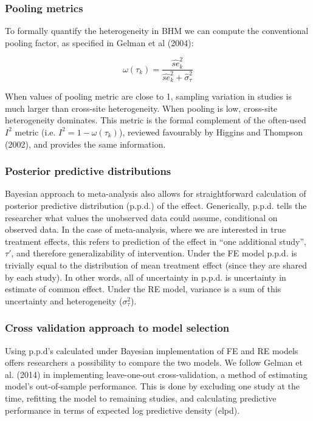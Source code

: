 \documentclass[12pt]{article}
\begin{document}
\subsubsection*{Pooling metrics}

To formally quantify the heterogeneity in BHM we can compute the conventional pooling factor, as specified in Gelman et al (2004):

\begin{equation}
\omega(\tau_k) = \frac{\hat{se}^2_k }{\hat{se}^2_k + \hat{\sigma}_{\tau}^2 }
\end{equation}

When values of pooling metric are close to 1, sampling variation in studies is much larger than cross-site heterogeneity. When pooling is low, cross-site heterogeneity dominates. This metric is the formal complement of the often-used $I^2$ metric (i.e. $I^2 = 1- \omega(\tau_k)$), reviewed favourably by Higgins and Thompson (2002), and provides the same information. 


\subsubsection*{Posterior predictive distributions}

Bayesian approach to meta-analysis also allows for straightforward calculation of posterior predictive distribution (p.p.d.) of the effect. Generically, p.p.d. tells the researcher what values the unobserved data could assume, conditional on observed data. In the case of meta-analysis, where we are interested in true treatment effects, this refers to prediction of the effect in ``one additional study'', $\tau'$, and therefore generalizability of intervention. Under the FE model p.p.d. is trivially equal to the distribution of mean treatment effect (since they are shared by each study). In other words, all of uncertainty in p.p.d. is uncertainty in estimate of common effect. Under the RE model, variance is a sum of this uncertainty and heterogeneity ($\sigma_\tau^2$). 

\subsubsection*{Cross validation approach to model selection}

Using p.p.d's calculated under Bayesian implementation of FE and RE models offers researchers a possibility to compare the two models. We follow Gelman et al. (2014) in implementing leave-one-out cross-validation, a method of estimating model's out-of-sample performance. This is done by excluding one study at the time, refitting the model to remaining studies, and calculating predictive performance in terms of expected log predictive density (elpd).
\end{document}

